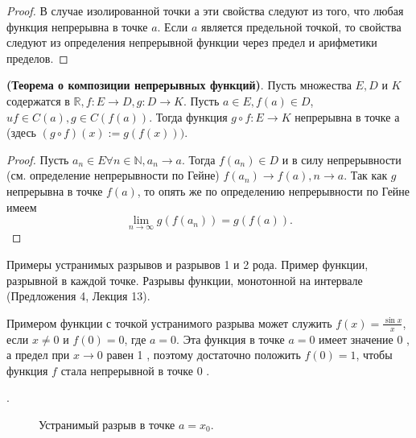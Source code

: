 \begin{proof}
    В случае изолированной точки $а$ эти свойства следуют из того, что любая функция непрерывна в точке $a$. Если $a$ является предельной точкой, то свойства следуют из определения непрерывной функции через предел и арифметики пределов.
\end{proof}

\begin{proposition}
    \textbf{(Теорема о композиции непрерывных функций)}. Пусть множества $E, D$ и $K$ содержатся в $\mathbb{R}, f: E \rightarrow D, g: D \rightarrow K$. Пусть $a \in E, f(a) \in D$, $u f \in C(a), g \in C(f(a))$. Тогда функция $g \circ f: E \rightarrow K$ непрерывна в точке а (здесь $(g \circ f)(x):=g(f(x)))$.
\end{proposition}

\begin{proof}
    Пусть $a_n \in E \forall n \in \mathbb{N}, a_n \rightarrow a$. Тогда $f\left(a_n\right) \in D$ и в силу непрерывности (см. определение непрерывности по Гейне) $f\left(a_n\right) \rightarrow f(a), n \rightarrow a$. Так как $g$ непрерывна в точке $f(a)$, то опять же по определению непрерывности по Гейне имеем
    $$
        \lim _{n \rightarrow \infty} g\left(f\left(a_n\right)\right)=g(f(a)) .
    $$
\end{proof}

\newpage
\begin{problem}
Примеры устранимых разрывов и разрывов 1 и 2 рода. Пример функции, разрывной в
каждой точке. Разрывы функции, монотонной на интервале (Предложения 4, Лекция 13).
\end{problem}
Примером функции с точкой устранимого разрыва может служить $f(x)=\frac{\sin x}{x}$, если $x \neq 0$ и $f(0)=0$, где $a=0$. Эта функция в точке $a=0$ имеет значение 0 , а предел при $x \rightarrow 0$ равен 1 , поэтому достаточно положить $f(0)=1$, чтобы функция $f$ стала непрерывной в точке 0 .

. \begin{figure}[h!]
    \caption{Устранимый разрыв в точке $a=x_0$.}
    \label{fig:image}
\end{figure}

